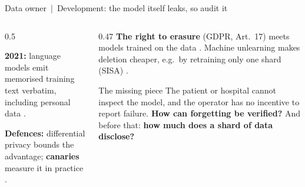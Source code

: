 \documentclass[aspectratio=169,10pt]{beamer}
\begin{document}
\begin{frame}{Data owner \,|\, Development: the model itself leaks, so audit it}
\begin{columns}[T]
\begin{column}{0.5\textwidth}
\vspace{1mm}
{\footnotesize\textbf{2021:} language models emit memorised training text verbatim, including personal data .

\vspace{1mm}
\textbf{Defences:} differential privacy bounds the advantage; \textbf{canaries} measure it in practice .}
\end{column}
\begin{column}{0.47\textwidth}
{\footnotesize\textbf{The right to erasure} (GDPR, Art.~17) meets models trained on the data . Machine unlearning makes deletion cheaper, e.g.\ by retraining only one shard (SISA) .}
\vspace{2mm}
\begin{alertblock}{The missing piece}
{\footnotesize The patient or hospital cannot inspect the model, and the operator has no incentive to report failure. \textbf{How can forgetting be verified?} And before that: \textbf{how much does a shard of data disclose?}}
\end{alertblock}
\end{column}
\end{columns}
\end{frame}
\end{document}
